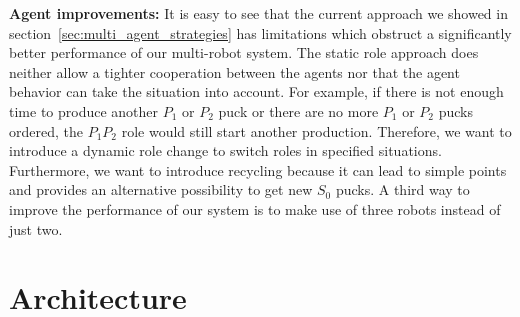 \textbf{Agent improvements:} It is easy to see that the current approach we showed in section~\ref{sec:multi_agent_strategies} has limitations which obstruct a significantly better performance of our multi-robot system. The static role approach does neither allow a tighter cooperation between the agents nor that the agent behavior can take the situation into account. For example, if there is not enough time to produce another $P_1$ or $P_2$ puck or there are no more $P_1$ or $P_2$ pucks ordered, the $P_1P_2$ role would still start another production. Therefore, we want to introduce a dynamic role change to switch roles in specified situations. Furthermore, we want to introduce recycling because it can lead to simple points and provides an alternative possibility to get new $S_0$ pucks. A third way to improve the performance of our system is to make use of three robots instead of just two.\\





\section{Architecture}
\label{sec:architecture}

